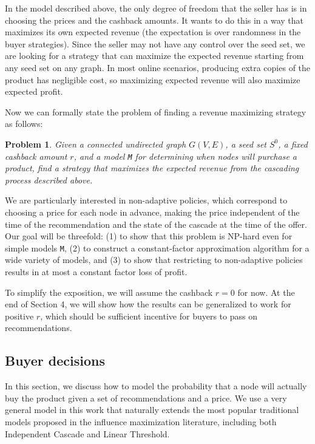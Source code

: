 \documentclass[letterpaper,twoside]{article}
\newtheorem{problem}{Problem}
\newcommand{\M}{\texttt{M}}
\begin{document}
In the model described above, the only degree of freedom that the
seller has is in choosing the prices and the cashback amounts. It wants
to do this in a way that maximizes its own expected revenue
(the expectation is over randomness in the buyer strategies). Since
the seller may not have any control over the seed set, we are
looking for a strategy that can maximize the expected revenue starting
from any seed set on any graph. In most
online scenarios, producing extra copies of the product has negligible
cost, so maximizing expected revenue will also maximize expected profit.

Now we can formally state the problem of finding a revenue
maximizing strategy as follows:
\begin{problem} \label{problem:strategy}
  Given a connected undirected graph $G(V,E)$, a seed set $S^0$, a
  fixed cashback amount $r$, and a model \M{} for determining when
  nodes will purchase a product, find a strategy that
  maximizes the expected revenue from the cascading process
  described above.
\end{problem}
We are particularly interested in non-adaptive policies, which
correspond to choosing a price for each node in advance, making the price
independent of the time of the recommendation and the state of the cascade at
the time of the offer. Our goal
will be threefold: (1) to show that this problem is NP-hard even for
simple models \M, (2) to construct a constant-factor approximation
algorithm for a wide variety of models, and (3) to show that
restricting to non-adaptive policies results in at most a constant
factor loss of profit.

To simplify the exposition, we will assume the cashback $r = 0$ for
now. At the end of Section 4, we will show how the results can be
generalized to work for positive $r$, which should be sufficient
incentive for buyers to pass on recommendations.

\subsection{Buyer decisions}
\label{sec:BuyerDecision}
In this section, we discuss how to model the probability that a node
will actually buy the product given a set of recommendations and a
price. We use a very general model in this work that naturally extends the most
popular traditional models proposed in the influence maximization literature, including both Independent Cascade and Linear
Threshold.
\end{document}
